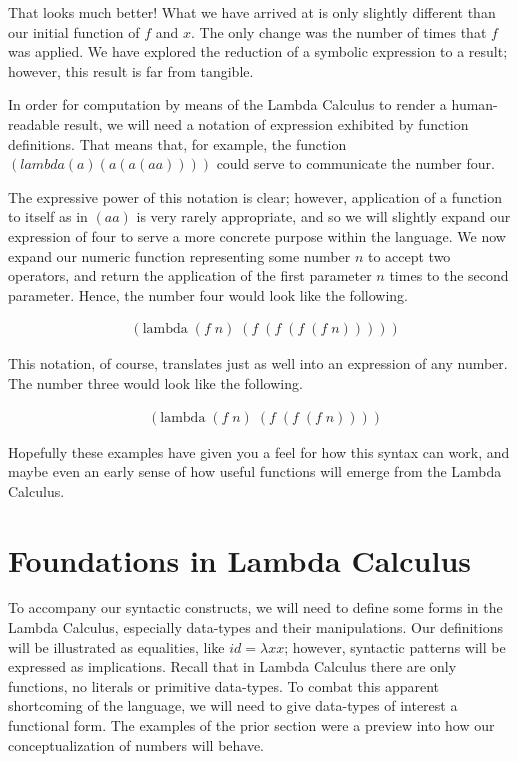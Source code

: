 That looks much better! What we have arrived at is only slightly different than
our initial function of $f$ and $x$. The only change was the number of times that
$f$ was applied. We have explored the reduction of a symbolic expression to a
result; however, this result is far from tangible.

In order for computation by means of the Lambda Calculus to render a 
human-readable result, we will need a notation of expression exhibited by function
definitions. That means that, for example, the function 
$(lambda (a) (a (a (a a))))$ could serve to communicate the number four.

The expressive power of this notation is clear; however, application of a function 
to itself as in $(a a)$ is very rarely appropriate, and so we will slightly expand 
our expression of four to serve a more concrete purpose within the language. We
now expand our numeric function representing some number $n$ to accept two
operators, and return the application of the first parameter $n$ times to the
second parameter. Hence, the number four would look like the following.

\begin{figure}[htp]
\caption{}\label{scheme}
\begin{align*}
& (\text{lambda} \; (f \; n) \; (f \; (f \; (f \; (f \; n)))))
\end{align*}
\end{figure}

This notation, of course, translates just as well into an expression of any
number. The number three would look like the following.

\begin{figure}[htp]
\caption{}\label{scheme}
\begin{align*}
& (\text{lambda} \; (f \; n) \; (f \; (f \; (f \; n))))
\end{align*}
\end{figure}

Hopefully these examples have given you a feel for how this syntax can work, and
maybe even an early sense of how useful functions will emerge from the Lambda
Calculus.

\section{Foundations in Lambda Calculus}
To accompany our syntactic constructs, we will need to define some forms in the
Lambda Calculus, especially data-types and their manipulations. Our definitions
will be illustrated as equalities, like $id = \lambda xx$; however, syntactic
patterns will be expressed as implications. Recall that in Lambda Calculus there
are only functions, no literals or primitive data-types. To combat this apparent
shortcoming of the language, we will need to give data-types of interest a
functional form. The examples of the prior section were a preview into how our
conceptualization of numbers will behave.


